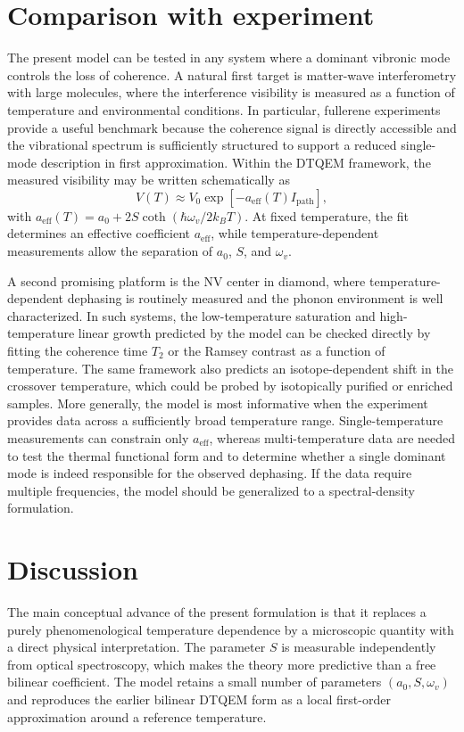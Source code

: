 \documentclass[aps,prl,twocolumn,showpacs,superscriptaddress,groupedaddress]{revtex4-2}
\begin{document}
\section{Comparison with experiment}

The present model can be tested in any system where a dominant vibronic mode controls the loss of coherence. A natural first target is matter-wave interferometry with large molecules, where the interference visibility is measured as a function of temperature and environmental conditions. In particular, fullerene experiments provide a useful benchmark because the coherence signal is directly accessible and the vibrational spectrum is sufficiently structured to support a reduced single-mode description in first approximation. Within the DTQEM framework, the measured visibility may be written schematically as
\[
V(T)\approx V_0\exp[-a_{\mathrm{eff}}(T)I_{\mathrm{path}}],
\]
with \(a_{\mathrm{eff}}(T)=a_0+2S\coth(\hbar\omega_v/2k_B T)\). At fixed temperature, the fit determines an effective coefficient \(a_{\mathrm{eff}}\), while temperature-dependent measurements allow the separation of \(a_0\), \(S\), and \(\omega_v\).

A second promising platform is the NV center in diamond, where temperature-dependent dephasing is routinely measured and the phonon environment is well characterized. In such systems, the low-temperature saturation and high-temperature linear growth predicted by the model can be checked directly by fitting the coherence time \(T_2\) or the Ramsey contrast as a function of temperature. The same framework also predicts an isotope-dependent shift in the crossover temperature, which could be probed by isotopically purified or enriched samples. More generally, the model is most informative when the experiment provides data across a sufficiently broad temperature range. Single-temperature measurements can constrain only \(a_{\mathrm{eff}}\), whereas multi-temperature data are needed to test the thermal functional form and to determine whether a single dominant mode is indeed responsible for the observed dephasing. If the data require multiple frequencies, the model should be generalized to a spectral-density formulation.

\section{Discussion}

The main conceptual advance of the present formulation is that it replaces a purely phenomenological temperature dependence by a microscopic quantity with a direct physical interpretation. The parameter \(S\) is measurable independently from optical spectroscopy, which makes the theory more predictive than a free bilinear coefficient. The model retains a small number of parameters \((a_0,S,\omega_v)\) and reproduces the earlier bilinear DTQEM form as a local first-order approximation around a reference temperature.
\end{document}
